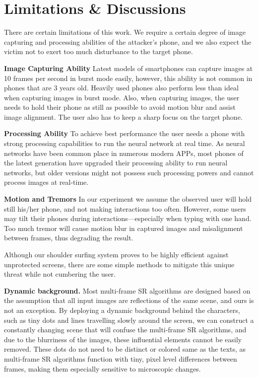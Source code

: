 \section{Limitations \& Discussions}
\label{sec-limitations-and-discussions}
There are certain limitations of this work. We require a certain degree of image capturing and processing abilities of the attacker's phone, and we also expect the victim not to exert too much disturbance to the target phone.

\vspace{1mm}
\noindent
\textbf{Image Capturing Ability}
Latest models of smartphones can capture images at 10 frames per second in burst mode easily, however, this ability is not common in phones that are 3 years old. Heavily used phones also perform less than ideal when capturing images in burst mode. Also, when capturing images, the user needs to hold their phone as still as possible to avoid motion blur and assist image alignment. The user also has to keep a sharp focus on the target phone.

\vspace{1mm}
\noindent
\textbf{Processing Ability}
To achieve best performance the user needs a phone with strong processing capabilities to run the neural network at real time. As neural networks have been common place in numerous modern APPs, most phones of the latest generation have upgraded their processing ability to run neural networks, but older versions might not possess such processing powers and cannot process images at real-time.

\vspace{1mm}
\noindent
\textbf{Motion and Tremors}
In our experiment we assume the observed user will hold still his/her phone, and not making interactions too often. However, some users may tilt their phones during interactions---especially when typing with one hand. Too much tremor will cause motion blur in captured images and misalignment between frames, thus degrading the result.

Although our shoulder surfing system proves to be highly efficient against unprotected screens, there are some simple methods to mitigate this unique threat while not cumbering the user.

\vspace{1mm}
\noindent
\textbf{Dynamic background.} Most multi-frame SR algorithms are designed based on the assumption that all input images are reflections of the same scene, and ours is not an exception. By deploying a dynamic background behind the characters, such as tiny dots and lines travelling slowly around the screen, we can construct a constantly changing scene that will confuse the multi-frame SR algorithms, and due to the blurriness of the images, these influential elements cannot be easily removed. These dots do not need to be distinct or colored same as the texts, as multi-frame SR algorithms function with tiny, pixel level differences between frames, making them especially sensitive to microscopic changes.

